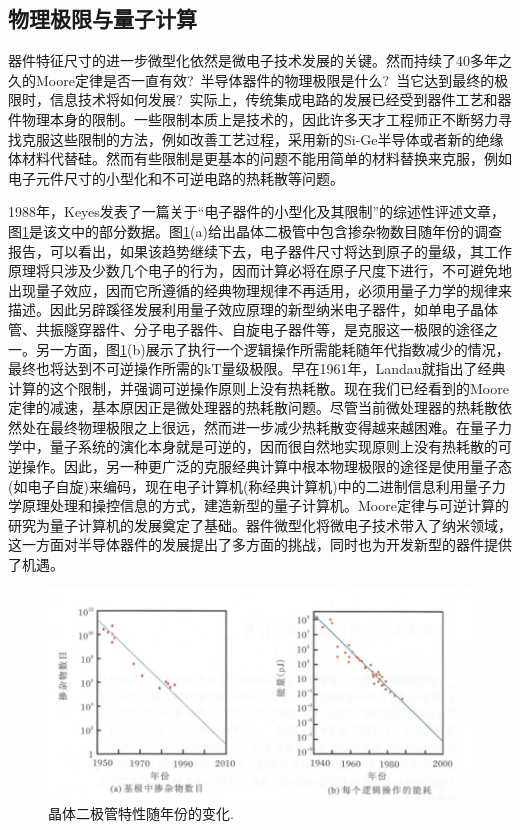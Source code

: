 \subsection{物理极限与量子计算} 
器件特征尺寸的进一步微型化依然是微电子技术发展的关键。然而持续了40多年之久的Moore定律是否一直有效?~半导体器件的物理极限是什么?~当它达到最终的极限时，信息技术将如何发展?~实际上，传统集成电路的发展已经受到器件工艺和器件物理本身的限制。一些限制本质上是技术的，因此许多天才工程师正不断努力寻找克服这些限制的方法，例如改善工艺过程，采用新的Si-Ge半导体或者新的绝缘体材料代替硅。然而有些限制是更基本的问题不能用简单的材料替换来克服，例如电子元件尺寸的小型化和不可逆电路的热耗散等问题。

1988年，Keyes发表了一篇关于``电子器件的小型化及其限制''的综述性评述文章，图\ref{Fig:Diode_tube}是该文中的部分数据。图\ref{Fig:Diode_tube}(a)给出晶体二极管中包含掺杂物数目随年份的调查报告，可以看出，如果该趋势继续下去，电子器件尺寸将达到原子的量级，其工作原理将只涉及少数几个电子的行为，因而计算必将在原子尺度下进行，不可避免地出现量子效应，因而它所遵循的经典物理规律不再适用，必须用量子力学的规律来描述。因此另辟蹊径发展利用量子效应原理的新型纳米电子器件，如单电子晶体管、共振隧穿器件、分子电子器件、自旋电子器件等，是克服这一极限的途径之一。另一方面，图\ref{Fig:Diode_tube}(b)展示了执行一个逻辑操作所需能耗随年代指数减少的情况，最终也将达到不可逆操作所需的$\mathrm{kT}$量级极限。早在1961年，Landau就指出了经典计算的这个限制，并强调可逆操作原则上没有热耗散。现在我们已经看到的Moore定律的减速，基本原因正是微处理器的热耗散问题。尽管当前微处理器的热耗散依然处在最终物理极限之上很远，然而进一步减少热耗散变得越来越困难。在量子力学中，量子系统的演化本身就是可逆的，因而很自然地实现原则上没有热耗散的可逆操作。因此，另一种更广泛的克服经典计算中根本物理极限的途径是使用量子态(如电子自旋)来编码，现在电子计算机(称经典计算机)中的二进制信息利用量子力学原理处理和操控信息的方式，建造新型的量子计算机。Moore定律与可逆计算的研究为量子计算机的发展奠定了基础。器件微型化将微电子技术带入了纳米领域，这一方面对半导体器件的发展提出了多方面的挑战，同时也为开发新型的器件提供了机遇。
\begin{figure}[h!]
\centering
\vspace*{-0.10in}
\includegraphics[height=2.20in,width=4.70in,viewport=0 0 105 50,clip]{Figures/Diode_tube.png}
\caption{\small \textrm{晶体二极管特性随年份的变化.}}%
\label{Fig:Diode_tube}
\end{figure} 

